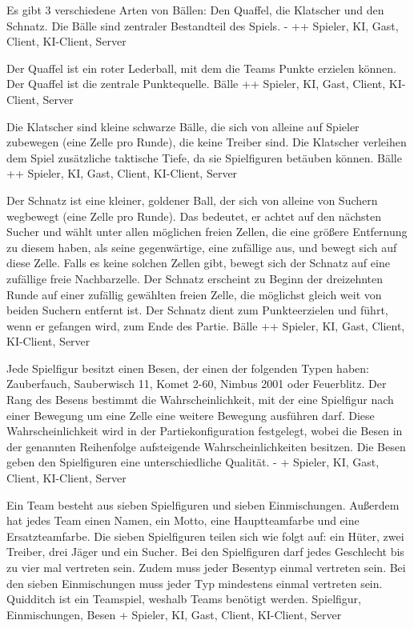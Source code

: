         {Es gibt 3 verschiedene Arten von Bällen: Den Quaffel, die Klatscher und den Schnatz.}
        {Die Bälle sind zentraler Bestandteil des Spiels.}
        {-}
        {++}
        {Spieler, KI, Gast, Client, KI-Client, Server}

        {Der Quaffel ist ein roter Lederball, mit dem die Teams Punkte erzielen können.}
        {Der Quaffel ist die zentrale Punktequelle.}
        {Bälle}
        {++}
        {Spieler, KI, Gast, Client, KI-Client, Server}

        {Die Klatscher sind kleine schwarze Bälle, die sich von alleine auf Spieler zubewegen (eine Zelle pro Runde), die keine Treiber sind.}
        {Die Klatscher verleihen dem Spiel zusätzliche taktische Tiefe, da sie Spielfiguren betäuben können.}
        {Bälle}
        {++}
        {Spieler, KI, Gast, Client, KI-Client, Server}

        {Der Schnatz ist eine kleiner, goldener Ball, der sich von alleine von Suchern wegbewegt (eine Zelle pro Runde). Das bedeutet, er achtet auf den nächsten Sucher und wählt unter allen möglichen freien Zellen, die eine größere Entfernung zu diesem haben, als seine gegenwärtige, eine zufällige aus, und bewegt sich auf diese Zelle. Falls es keine solchen Zellen gibt, bewegt sich der Schnatz auf eine zufällige freie Nachbarzelle. Der Schnatz erscheint zu Beginn der dreizehnten Runde auf einer zufällig gewählten freien Zelle, die möglichst gleich weit von beiden Suchern entfernt ist.}
        {Der Schnatz dient zum Punkteerzielen und führt, wenn er gefangen wird, zum Ende des Partie.}
        {Bälle}
        {++}
        {Spieler, KI, Gast, Client, KI-Client, Server}

        {Jede Spielfigur besitzt einen Besen, der einen der folgenden Typen haben: Zauberfauch, Sauberwisch 11, Komet 2-60, Nimbus 2001 oder Feuerblitz. Der Rang des Besens bestimmt die Wahrscheinlichkeit, mit der eine Spielfigur nach einer Bewegung um eine Zelle eine weitere Bewegung ausführen darf. Diese Wahrscheinlichkeit wird in der Partiekonfiguration festgelegt, wobei die Besen in der genannten Reihenfolge aufsteigende Wahrscheinlichkeiten besitzen.}
        {Die Besen geben den Spielfiguren eine unterschiedliche Qualität.}
        {-}
        {+}
        {Spieler, KI, Gast, Client, KI-Client, Server}
        
        {Ein Team besteht aus sieben Spielfiguren und sieben Einmischungen. Außerdem hat jedes Team einen Namen, ein Motto, eine Hauptteamfarbe und eine Ersatzteamfarbe. Die sieben Spielfiguren teilen sich wie folgt auf:  ein Hüter, zwei Treiber, drei Jäger und ein Sucher. Bei den Spielfiguren darf jedes Geschlecht bis zu vier mal vertreten sein. Zudem muss jeder Besentyp einmal vertreten sein. Bei den sieben Einmischungen muss jeder Typ mindestens einmal vertreten sein.}
        {Quidditch ist ein Teamspiel, weshalb Teams benötigt werden.}
        {Spielfigur, Einmischungen, Besen}
        {+}
        {Spieler, KI, Gast, Client, KI-Client, Server}

